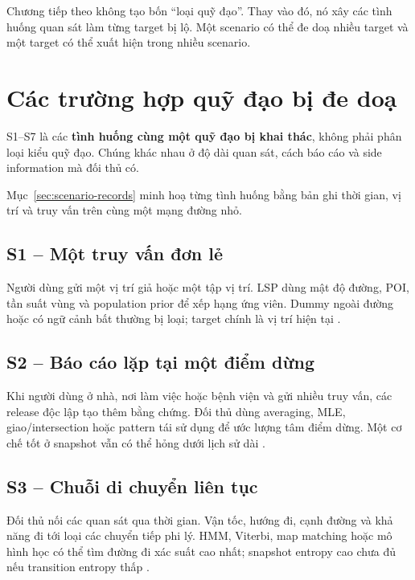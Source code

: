\documentclass[12pt,a4paper,oneside]{report}
\begin{document}
Chương tiếp theo không tạo bốn ``loại quỹ đạo''. Thay vào đó, nó xây các tình huống quan sát làm từng target bị lộ. Một scenario có thể đe doạ nhiều target và một target có thể xuất hiện trong nhiều scenario.

\chapter{Các trường hợp quỹ đạo bị đe doạ}
\label{ch:scenarios}

S1--S7 là các \textbf{tình huống cùng một quỹ đạo bị khai thác}, không phải phân loại kiểu quỹ đạo. Chúng khác nhau ở độ dài quan sát, cách báo cáo và side information mà đối thủ có.

Mục~\ref{sec:scenario-records} minh hoạ từng tình huống bằng bản ghi thời gian, vị trí và truy vấn trên cùng một mạng đường nhỏ.

\section{S1 -- Một truy vấn đơn lẻ}

Người dùng gửi một vị trí giả hoặc một tập vị trí. LSP dùng mật độ đường, POI, tần suất vùng và population prior để xếp hạng ứng viên. Dummy ngoài đường hoặc có ngữ cảnh bất thường bị loại; target chính là vị trí hiện tại \citep{niu2014dls}.

\section{S2 -- Báo cáo lặp tại một điểm dừng}

Khi người dùng ở nhà, nơi làm việc hoặc bệnh viện và gửi nhiều truy vấn, các release độc lập tạo thêm bằng chứng. Đối thủ dùng averaging, MLE, giao/intersection hoặc pattern tái sử dụng để ước lượng tâm điểm dừng. Một cơ chế tốt ở snapshot vẫn có thể hỏng dưới lịch sử dài \citep{sun2017asa}.

\section{S3 -- Chuỗi di chuyển liên tục}

Đối thủ nối các quan sát qua thời gian. Vận tốc, hướng đi, cạnh đường và khả năng đi tới loại các chuyển tiếp phi lý. HMM, Viterbi, map matching hoặc mô hình học có thể tìm đường đi xác suất cao nhất; snapshot entropy cao chưa đủ nếu transition entropy thấp \citep{shaham2021viterbi,xiao2015temporal,yadav2024transprotect}.
\end{document}
